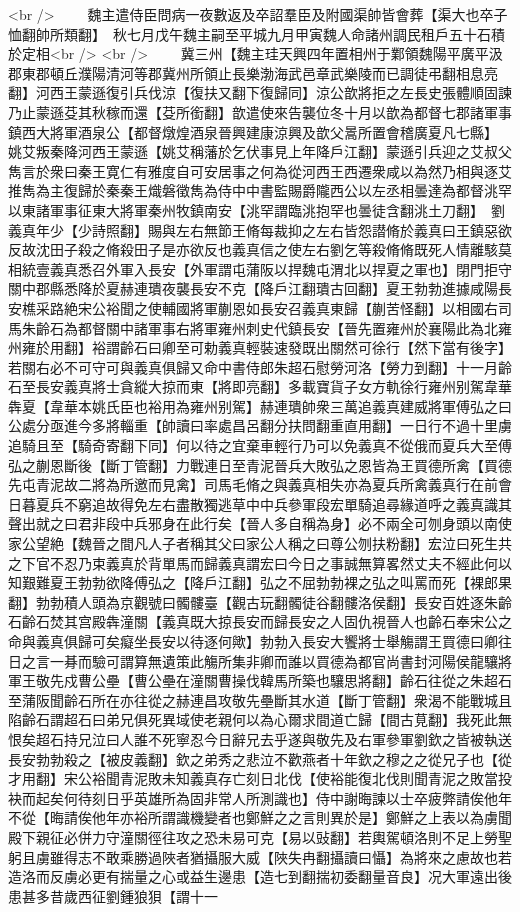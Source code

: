 <br />
　　魏主遣侍臣問病一夜數返及卒詔羣臣及附國渠帥皆會葬【渠大也卒子恤翻帥所類翻】　秋七月戊午魏主嗣至平城九月甲寅魏人命諸州調民租戶五十石積於定相<br />
<br />
　　冀三州【魏主珪天興四年置相州于鄴領魏陽平廣平汲郡東郡頓丘濮陽清河等郡冀州所領止長樂渤海武邑章武樂陵而已調徒弔翻相息亮翻】河西王蒙遜復引兵伐涼【復扶又翻下復歸同】涼公歆將拒之左長史張體順固諫乃止蒙遜芟其秋稼而還【芟所銜翻】歆遣使來告襲位冬十月以歆為都督七郡諸軍事鎮西大將軍酒泉公【都督燉煌酒泉晉興建康涼興及歆父暠所置會稽廣夏凡七縣】　姚艾叛秦降河西王蒙遜【姚艾稱藩於乞伏事見上年降戶江翻】蒙遜引兵迎之艾叔父雋言於衆曰秦王寛仁有雅度自可安居事之何為從河西王西遷衆咸以為然乃相與逐艾推雋為主復歸於秦秦王熾磐徵雋為侍中中書監賜爵隴西公以左丞相曇達為都督洮罕以東諸軍事征東大將軍秦州牧鎮南安【洮罕謂臨洮抱罕也曇徒含翻洮土刀翻】　劉義真年少【少詩照翻】賜與左右無節王脩每裁抑之左右皆怨譛脩於義真曰王鎮惡欲反故沈田子殺之脩殺田子是亦欲反也義真信之使左右劉乞等殺脩脩既死人情離駭莫相統壹義真悉召外軍入長安【外軍謂屯蒲阪以捍魏屯渭北以捍夏之軍也】閉門拒守關中郡縣悉降於夏赫連璝夜襲長安不克【降戶江翻璝古回翻】夏王勃勃進據咸陽長安樵采路絶宋公裕聞之使輔國將軍蒯恩如長安召義真東歸【蒯苦怪翻】以相國右司馬朱齡石為都督關中諸軍事右將軍雍州刺史代鎮長安【晉先置雍州於襄陽此為北雍州雍於用翻】裕謂齡石曰卿至可勅義真輕裝速發既出關然可徐行【然下當有後字】若關右必不可守可與義真俱歸又命中書侍郎朱超石慰勞河洛【勞力到翻】十一月齡石至長安義真將士貪縱大掠而東【將即亮翻】多載寶貨子女方軌徐行雍州别駕韋華犇夏【韋華本姚氏臣也裕用為雍州别駕】赫連璝帥衆三萬追義真建威將軍傅弘之曰公處分亟進今多將輜重【帥讀曰率處昌呂翻分扶問翻重直用翻】一日行不過十里虜追騎且至【騎奇寄翻下同】何以待之宜棄車輕行乃可以免義真不從俄而夏兵大至傅弘之蒯恩斷後【斷丁管翻】力戰連日至青泥晉兵大敗弘之恩皆為王買德所禽【買德先屯青泥故二將為所邀而見禽】司馬毛脩之與義真相失亦為夏兵所禽義真行在前會日暮夏兵不窮追故得免左右盡散獨逃草中中兵參軍段宏單騎追尋緣道呼之義真識其聲出就之曰君非段中兵邪身在此行矣【晉人多自稱為身】必不兩全可刎身頭以南使家公望絶【魏晉之間凡人子者稱其父曰家公人稱之曰尊公刎扶粉翻】宏泣曰死生共之下官不忍乃束義真於背單馬而歸義真謂宏曰今日之事誠無算畧然丈夫不經此何以知艱難夏王勃勃欲降傅弘之【降戶江翻】弘之不屈勃勃裸之弘之叫罵而死【裸郎果翻】勃勃積人頭為京觀號曰髑髏臺【觀古玩翻髑徒谷翻髏洛侯翻】長安百姓逐朱齡石齡石焚其宫殿犇潼關【義真既大掠長安而歸長安之人固仇視晉人也齡石奉宋公之命與義真俱歸可矣癡坐長安以待逐何歟】勃勃入長安大饗將士舉觴謂王買德曰卿往日之言一朞而驗可謂算無遺策此觴所集非卿而誰以買德為都官尚書封河陽侯龍驤將軍王敬先戍曹公壘【曹公壘在潼關曹操伐韓馬所築也驤思將翻】齡石往從之朱超石至蒲阪聞齡石所在亦往從之赫連昌攻敬先壘斷其水道【斷丁管翻】衆渴不能戰城且陷齡石謂超石曰弟兄俱死異域使老親何以為心爾求間道亡歸【間古莧翻】我死此無恨矣超石持兄泣曰人誰不死寧忍今日辭兄去乎遂與敬先及右軍參軍劉欽之皆被執送長安勃勃殺之【被皮義翻】欽之弟秀之悲泣不歡燕者十年欽之穆之之從兄子也【從才用翻】宋公裕聞青泥敗未知義真存亡刻日北伐【使裕能復北伐則聞青泥之敗當投袂而起矣何待刻日乎英雄所為固非常人所測識也】侍中謝晦諫以士卒疲弊請俟他年不從【晦請俟他年亦裕所謂識機變者也鄭鮮之之言則異於是】鄭鮮之上表以為虜聞殿下親征必併力守潼關徑往攻之恐未易可克【易以䜴翻】若輿駕頓洛則不足上勞聖躬且虜雖得志不敢乘勝過陜者猶攝服大威【陜失冉翻攝讀曰懾】為將來之慮故也若造洛而反虜必更有揣量之心或益生邊患【造七到翻揣初委翻量音良】况大軍遠出後患甚多昔歲西征劉鍾狼狽【謂十一